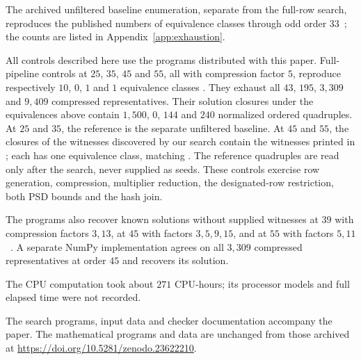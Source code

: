 \documentclass[11pt]{article}
\begin{document}
The archived unfiltered baseline enumeration, separate from the full-row
search, reproduces the published numbers of equivalence classes through
odd order $33$~\cite[Table 1]{HKT}; the counts are listed in
Appendix~\ref{app:exhaustion}.

All controls described here use the programs distributed with this paper.
Full-pipeline controls at $25$, $35$, $45$ and $55$, all with compression
factor $5$, reproduce respectively $10$, $0$, $1$ and $1$ equivalence classes
\cite[Table~1]{HKT}. They exhaust all $43$, $195$, $3{,}309$ and $9{,}409$ compressed
representatives. Their solution closures under the equivalences above
contain $1{,}500$, $0$, $144$ and $240$ normalized ordered quadruples.
At $25$ and $35$, the reference is the separate unfiltered baseline.
At $45$ and $55$, the closures of the witnesses discovered by our search
contain the witnesses printed in \cite[Table~3]{HKT}; each has one
equivalence class, matching \cite[Table~1]{HKT}. The reference
quadruples are read only after the search, never supplied as seeds.
These controls exercise row generation, compression, multiplier reduction,
the designated-row restriction, both PSD bounds and the hash join.

The programs also recover known solutions without supplied witnesses
at $39$ with compression factors $3,13$, at $45$ with factors $3,5,9,15$,
and at $55$ with factors $5,11$~\cite[Section~4, Table~1]{HKT}.
A separate NumPy implementation agrees on
all $3{,}309$ compressed representatives at order $45$ and recovers its solution.

The CPU computation took about $271$ CPU-hours; its processor models and
full elapsed time were not recorded.

The search programs, input data and checker documentation accompany the
paper. The mathematical programs and data are unchanged from those archived at
\url{https://doi.org/10.5281/zenodo.23622210}.
\end{document}
